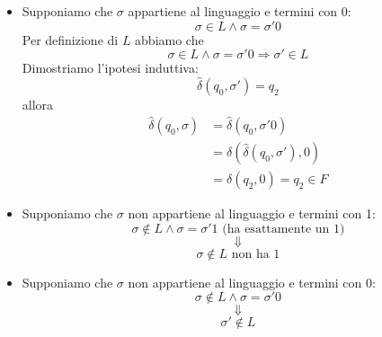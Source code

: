 \documentclass[a4paper]{article}
\begin{document}
\begin{example}
\begin{itemize}
\begin{itemize}
        \item Supponiamo che \( \sigma  \) appartiene al linguaggio e termini con 0:
          \[
            \sigma \in L \wedge \sigma = \sigma'0
          \] 
          Per definizione di \( L \) abbiamo che
          \[
            \sigma \in L \wedge \sigma = \sigma'0 \Rightarrow \sigma' \in L
          \] 
          Dimostriamo l'ipotesi induttiva:
          \[
            \hat{\delta}(q_0, \sigma') = q_2
          \] 
          allora
          \[
            \begin{aligned}
              \hat{\delta}(q_0, \sigma) &= \hat{\delta}(q_0, \sigma'0)\\
                                        &= \delta(\hat{\delta}(q_0, \sigma'), 0)\\
                                        &= \delta(q_2, 0) = q_2 \in F
            \end{aligned}
          \] 

        \item Supponiamo che \( \sigma  \) non appartiene al linguaggio e termini con 1:
          \[
            \sigma \notin L \wedge  \sigma  = \sigma'1 \text{ (ha esattamente un 1)}
          \] 
          \[
            \Downarrow
          \] 
          \[
            \sigma  \notin L \text{ non ha 1}
          \] 

        \item Supponiamo che \( \sigma  \) non appartiene al linguaggio e termini con 0:
          \[
            \sigma \notin L \wedge  \sigma  = \sigma'0
          \] 
          \[
            \Downarrow
          \] 
          \[
            \sigma' \notin L
          \] 
      \end{itemize}
  \end{itemize}
\end{example}
\end{document}
